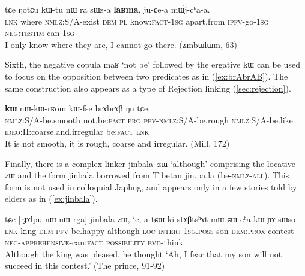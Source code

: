 \documentclass[oldfontcommands,oneside,a4paper,11pt]{article}
\newcommand{\ipa}[1]{{\phon \mbox{#1}}} %
\newcommand{\refb}[1]{(\ref{#1})}
\begin{document}
 \begin{exe}
\ex \label{ex:sWza.laRma}
\gll
 \ipa{tɕe}  	\ipa{ŋotɕu}  	\ipa{kɯ-tu}  	\ipa{nɯ} \ipa{ra}  	\ipa{sɯz-a}  	\ipa{\textbf{laʁma},}  	\ipa{ju-ɕe-a}  	\ipa{mɯ́j-cʰa-a.}  	\\
 \textsc{lnk} where \textsc{nmlz}:S/A-exist \textsc{dem} \textsc{pl} know:\textsc{fact}-\textsc{1sg} apart.from \textsc{ipfv}-go-\textsc{1sg} \textsc{neg:testim}-can-\textsc{1sg}\\
\glt I only know where they are, I cannot go there. (\ipa{ʑmbɯlɯm}, 63)
\end{exe}
Sixth, the negative copula \ipa{maʁ}  `not be' followed by the ergative \ipa{kɯ} can be used to focus on the opposition between two predicates as in \refb{ex:brAbrAB}. The same construction also appears as a type of Rejection linking \refb{sec:rejection}.
\begin{exe}
\ex \label{ex:brAbrAB}
\gll
[\ipa{kɯ-mpɕu}]  	\ipa{\textbf{maʁ}}  	\ipa{\textbf{kɯ}}  	\ipa{nɯ-kɯ-rʁom}  	\ipa{kɯ-fse}  	\ipa{brɤbrɤβ}  	\ipa{ŋu}  	\ipa{tɕe,}  \\
\textsc{nmlz:S/A}-be.smooth not.be:\textsc{fact} \textsc{erg}   \textsc{pfv-nmlz:S/A}-be.rough \textsc{nmlz:S/A}-be.like \textsc{ideo}:II:coarse.and.irregular be:\textsc{fact}  \textsc{lnk} \\
\glt It is not smooth, it is rough, coarse and irregular. (Mill, 172)
\end{exe}

Finally, there is a complex linker \ipa{jinbala zɯ} `although' comprising the locative \ipa{zɯ} and the form \ipa{jinbala} borrowed from Tibetan \ipa{jin.pa.la} (be-\textsc{nmlz-all}). This form is not used in colloquial Japhug, and appears only in a few stories told by elders as in \refb{ex:jinbala}.

\begin{exe}
\ex \label{ex:jinbala}
\gll 
\ipa{tɕe}  	[\ipa{rɟɤlpu}  	\ipa{nɯ}  	\ipa{nɯ-rga}]  	\ipa{jinbala}  	\ipa{zɯ,}  	\ipa{`e,}  	\ipa{a-tɕɯ}  	\ipa{ki}  	\ipa{stɤβtsʰɤt}  	\ipa{mɯ-ɕɯ-cʰa}  	\ipa{kɯ}  	\ipa{ɲɤ-sɯso}  \\
\textsc{lnk} king \textsc{dem} \textsc{pfv}-be.happy although \textsc{loc} \textsc{interj} \textsc{1sg.poss}-son \textsc{dem:prox} contest \textsc{neg-apprehensive}-can:\textsc{fact} \textsc{possibility} \textsc{evd}-think \\
\glt Although the king was pleased, he thought `Ah, I fear that my son will not succeed in this contest.' (The prince, 91-92)
 \end{exe}
\end{document}
